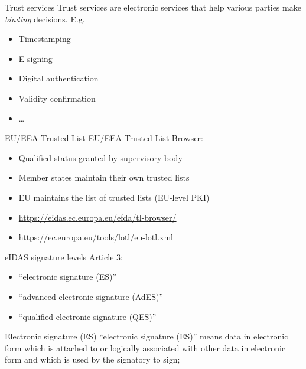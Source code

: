 \begin{frame}{Trust services}
  Trust services are electronic services that help various parties make \emph{binding} decisions.
  E.g.
  \begin{itemize}[<+(1)->]
    \item Timestamping
    \item E-signing
    \item Digital authentication
    \item Validity confirmation
    \item \dots
  \end{itemize}
\end{frame}

\begin{frame}{EU/EEA Trusted List}
  EU/EEA Trusted List Browser:
  \begin{itemize}[<+(1)->]
    \item Qualified status granted by supervisory body
    \item Member states maintain their own trusted lists
    \item EU maintains the list of trusted lists (EU-level PKI)
    \item {\scriptsize \url{https://eidas.ec.europa.eu/efda/tl-browser/}}
    \item {\scriptsize \url{https://ec.europa.eu/tools/lotl/eu-lotl.xml}}
  \end{itemize}
\end{frame}

\begin{frame}{eIDAS signature levels}
  Article 3:
  \settowidth{\offset}{10}
  \addtolength{\leftmargini}{\offset}
  \begin{itemize}[<+(1)->]
    \item[(10)] \enquote{electronic signature (ES)}
    \item[(11)] \enquote{advanced electronic signature (AdES)}
    \item[(12)] \enquote{qualified electronic signature (QES)}
  \end{itemize}
\end{frame}

\begin{frame}{Electronic signature (ES)}
  \enquote{electronic signature (ES)} means data in electronic form which is attached to or logically associated with other data in electronic form and which is used by the signatory to sign;
\end{frame}

